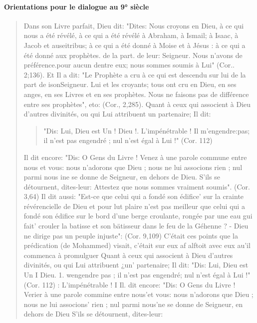 \paragraph{Orientations pour le dialogue au 9° siècle }
\begin{quote}
    

Dans son Livre parfait, Dieu dit: "Dites: Nous croyons en Dieu, à ce qui nous a été révélé, à ce qui a été révélé à Abraham, à Ismail; à Isaac, à Jacob et auseitribus; à ce qui a été donné à Moise et à Jésus : à ce qui a été donné aux prophètes. de la part. de leur: Seigneur.
Nous n'avons de préférence.pour aucun
dentre eux; nous sommes soumis à Lui" (Cor.. 2;136).
Et Il a dit: "Le Prophète a cru à ce qui est descendu sur lui de la part de isonSeigneur. Lui et les croyants; tous ont cru en Dieu, en ses anges, en ses Livres et en ses prophètes. Nous ne faisons pas de différence entre ses prophètes",
eto: (Cor., 2,285).
Quant à ceux qui associent à Dieu d'autres divinités, ou qui Lui attribuent un partenaire; Il dit:
\begin{quote}
    "Dis: Lui, Dieu est Un ! Dieu !.
L'impénétrable ! Il
m'engendre:pas; il n'est pas engendré ; nul n'est égal à Lui !" (Cor. 112) 
\end{quote}
Il dit encore: "Dis: O Gens du Livre ! Venez à une parole commune entre nous et vous: nous n'adorons que Dieu ; nous ne lui associons rien ; nul parmi nous ine se donne de Seigneur, en dehors de Dieu. S'ils se détournent, dites-leur:
Attestez que nous sommes vraiment soumis". (Cor. 3,64) Il dit aussi: "Est-ce que celui qui a fondé son édifice' sur la crainte révérencielle de Dieu et pour lut plaire n'est pas meilleur que celui qui a fondé son édifice sur le bord d'une berge croulante, rongée par une eau gui fait' crouler la batisse et son bätisseur dans le feu de la Géhenne ? - Dieu ne dirige pas un peuple
injuste": (Cor. 9,109)
C'était ces points que la prédication (de Mohammed) visait, c'était sur eux af alftoit avec eux au'il commenca à promulguer Quant à ceux qui associent à Dieu d'autres divinités, ou qui Lui attribuent ¿un' partenaire; Il dit: "Dis: Lui, Dieu est Un I Dieu. 1.
wengendre pas ; il n'est pas engendré; nul n'est égal à Lui !" (Cor. 112)
: L'impénétrable ! I
Il. dit encore: "Dis: O Gens du Livre ! Verier à une parole commine entre nous'et vous: nous n'adorons que Dieu ; nous ne lui associons' rien ; nul parmi nous'ne se donne de Seigneur, en dehors de Dieu S'ils se détournent, dites-leur:

\end{quote}
